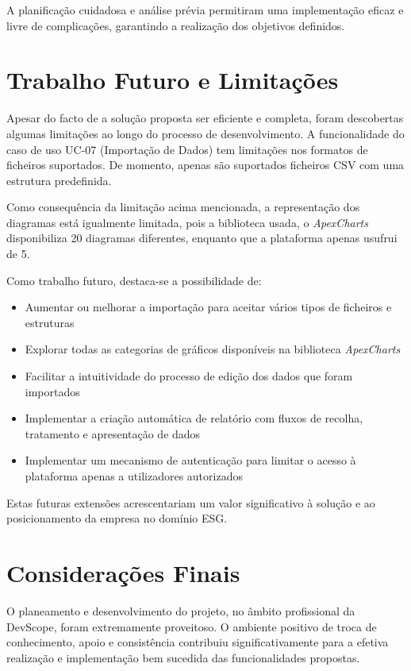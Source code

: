 A planificação cuidadosa e análise prévia permitiram uma implementação eficaz e livre de complicações, garantindo a realização dos objetivos definidos.

\section{Trabalho Futuro e Limitações}

Apesar do facto de a solução proposta ser eficiente e completa, foram descobertas algumas limitações ao longo do processo de desenvolvimento. A funcionalidade do caso de uso UC-07 (Importação de Dados) tem limitações nos formatos de ficheiros suportados. De momento, apenas são suportados ficheiros CSV com uma estrutura predefinida.

Como consequência da limitação acima mencionada, a representação dos diagramas está igualmente limitada, pois a biblioteca usada, o \textit{ApexCharts} disponibiliza 20 diagramas diferentes, enquanto que a plataforma apenas usufrui de 5.

Como trabalho futuro, destaca-se a possibilidade de:

\begin{itemize}
\item Aumentar ou melhorar a importação para aceitar vários tipos de ficheiros e estruturas
\item Explorar todas as categorias de gráficos disponíveis na biblioteca \textit{ApexCharts}
\item Facilitar a intuitividade do processo de edição dos dados que foram importados 
\item Implementar a criação automática de relatório com fluxos de recolha, tratamento e apresentação de dados
\item Implementar um mecanismo de autenticação para limitar o acesso à plataforma apenas a utilizadores autorizados
\end{itemize}

Estas futuras extensões acrescentariam um valor significativo à solução e ao posicionamento da empresa no domínio ESG.

\section{Considerações Finais}

O planeamento e desenvolvimento do projeto, no âmbito profissional da DevScope, foram extremamente proveitoso. O ambiente positivo de troca de conhecimento, apoio e consistência contribuiu significativamente para a efetiva realização e implementação bem sucedida das funcionalidades propostas.


